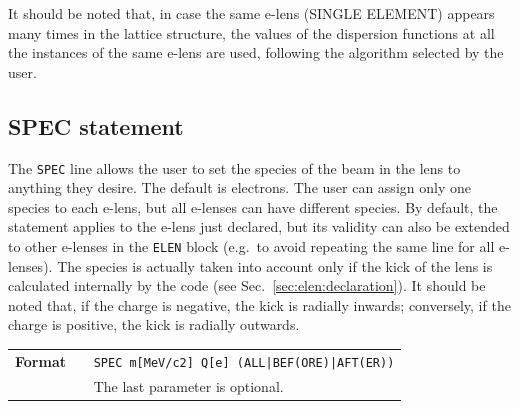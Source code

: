\bigskip
\noindent It should be noted that, in case the same e-lens (SINGLE ELEMENT) appears many times in the lattice structure, the values of the dispersion functions at all the instances of the same e-lens are used, following the algorithm selected by the user.

\subsection{SPEC statement}\label{sec:elen:SPEC}
The \texttt{SPEC} line allows the user to set the species of the beam in the lens to anything they desire.
The default is electrons.
The user can assign only one species to each e-lens, but all e-lenses can have different species.
By default, the statement applies to the e-lens just declared, but its validity can also be extended to other e-lenses in the \texttt{ELEN} block (e.g.~to avoid repeating the same line for all e-lenses).
The species is actually taken into account only if the kick of the lens is calculated internally by the code (see Sec.~\ref{sec:elen:declaration}).
It should be noted that, if the charge is negative, the kick is radially inwards; conversely, if the charge is positive, the kick is radially outwards.

\bigskip
\begin{tabular}{@{}lp{0.8\linewidth}}
    \textbf{Format}     & \texttt{SPEC  m[MeV/c2]  Q[e] (ALL|BEF(ORE)|AFT(ER))} \\
    & The last parameter is optional.  \\
\end{tabular}

